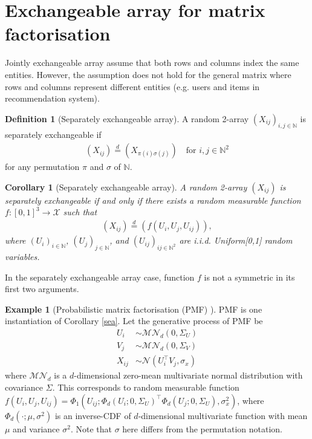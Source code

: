 \documentclass{article}
\newtheorem{corollary}{Corollary}[theorem] %
\theoremstyle{definition}
\newtheorem{definition}{Definition}
\newtheorem{example}{Example}[definition]
\begin{document}
\section{Exchangeable array for matrix factorisation}
Jointly exchangeable array assume that both rows and columns index the same entities. However, the assumption does not hold for the general matrix where rows and columns represent different entities (e.g. users and items in recommendation system).

\begin{definition}[Separately exchangeable array]A random 2-array $(X_{ij})_{i,j\in \mathbb{N}}$ is separately exchangeable if
\begin{align}
(X_{ij}) \stackrel{d}{=} (X_{\pi(i)\sigma(j)}) \quad \text{for } i,j \in \mathbb{N}^2
\end{align}
for any permutation $\pi$ and $\sigma$ of $\mathbb{N}$.
\end{definition}

\begin{corollary}[\label{sea}Separately exchangeable array] A random 2-array $(X_{ij})$ is separately exchangeable if and only if there exists a random measurable function $f:[0,1]^3 \rightarrow \mathcal{X}$ such that
\begin{align}
(X_{ij})  \stackrel{d}{=} (f(U_i, U_j, U_{ij})),
\end{align}
where $(U_i)_{i\in \mathbb{N}}$, $(U_j)_{j\in \mathbb{N}}$, and $(U_{ij})_{ij\in \mathbb{N}^2}$ are i.i.d. Uniform[0,1] random variables.
\end{corollary}
In the separately exchangeable array case, function $f$ is not a symmetric in its first two arguments.

\begin{example}[Probabilistic matrix factorisation (PMF) \cite{Salakhutdinov2008}] 
PMF is one instantiation of Corollary \ref{sea}. Let the generative process of PMF be
\begin{align}
U_i &\sim \mathcal{MN}_d(0, \Sigma_U)\\
V_j &\sim \mathcal{MN}_d(0, \Sigma_V)\\
X_{ij} &\sim \mathcal{N}(U_i^\top V_j, \sigma_x)
\end{align}
where $\mathcal{MN}_d$ is a $d$-dimensional zero-mean multivariate normal distribution with covariance $\Sigma$. This corresponds to random measurable function
$f(U_i, U_j, U_{ij}) = \Phi_1(U_{ij}; \Phi_d(U_i;0, \Sigma_{U})^\top \Phi_d(U_j;0, \Sigma_{U}), \sigma^2_x)$, where $\Phi_d(\cdot;\mu, \sigma^2)$ is an inverse-CDF of $d$-dimensional multivariate function with mean $\mu$ and variance $\sigma^2$. Note that $\sigma$ here differs from the permutation notation.
\end{example}
\end{document}
